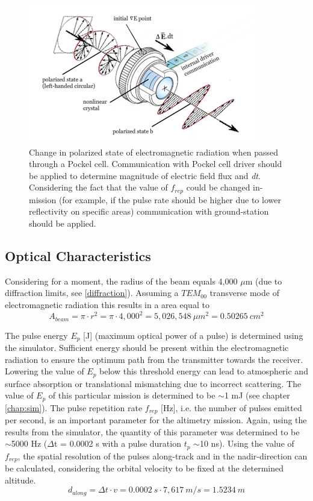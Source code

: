 \begin{figure} [ht]
\centering
\includegraphics[scale=1.2]{chapters/img/laser_polarized.png}	
\caption[Polarized state passed through a Pockel cell]{Change in polarized state of electromagnetic radiation when passed through a Pockel cell. Communication with Pockel cell driver should be applied to determine magnitude of electric field flux and \textit{dt}. Considering the fact that the value of $f_{rep}$ could be changed in-mission (for example, if the pulse rate should be higher due to lower reflectivity on specific areas) communication with ground-station should be applied.}
\label{fig:pockel_cell}
\end{figure}

\subsection{Optical Characteristics} 
\label{opticalchar}
Considering for a moment, the radius of the beam equals 4,000 $\mu$m (due to diffraction limits, see \ref{diffraction}). Assuming a $TEM_{00}$ transverse mode of electromagnetic radiation this results in a area equal to 
\begin{equation}
\label{area}
A_{beam} = \pi \cdot r^{2} = \pi \cdot 4,000^{2} = 5,026,548\ \mu m^{2} = 0.50265\ cm^{2}
\end{equation}

The pulse energy $E_{p}$ [J] (maximum optical power of a pulse) is determined using the simulator. Sufficient energy should be present within the electromagnetic radiation to ensure the optimum path from the transmitter towards the receiver. Lowering the value of $E_{p}$ below this threshold energy can lead to atmospheric and surface absorption or translational mismatching due to incorrect scattering. The value of $E_{p}$ of this particular mission is determined to be $\sim$1 mJ (see chapter \ref{chap:sim}).
The pulse repetition rate $f_{rep}$ [Hz], i.e. the number of pulses emitted per second, is an important parameter for the altimetry mission. Again, using the results from the simulator, the quantity of this parameter was determined to be $\sim$5000 Hz ($\Delta$t = 0.0002 s with a pulse duration $t_{p}$ $\sim$10 ns). Using the value of $f_{rep}$, the spatial resolution of the pulses along-track and in the nadir-direction can be calculated, considering the orbital velocity to be fixed at the determined altitude.  
\begin{equation}
\label{alongtrackres}
d_{along} = \Delta t \cdot v = 0.0002\ s \cdot 7,617\ m/s = 1.5234\ m
\end{equation}

